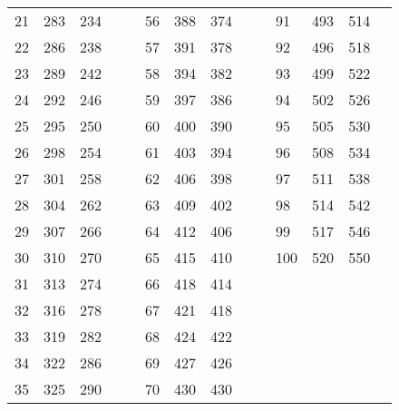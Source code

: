 \begin{table}[!h]
\begin{tabular}{|l|l|l|ll|l|l|l|llllll}
		21 & 283 & 234 &  &  & 56 & 388 & 374 &  & \multicolumn{1}{l|}{} & \multicolumn{1}{l|}{91} & \multicolumn{1}{l|}{493} & \multicolumn{1}{l|}{514} &  \\ \cline{1-3} \cline{6-8} \cline{11-13}
		22 & 286 & 238 &  &  & 57 & 391 & 378 &  & \multicolumn{1}{l|}{} & \multicolumn{1}{l|}{92} & \multicolumn{1}{l|}{496} & \multicolumn{1}{l|}{518} &  \\ \cline{1-3} \cline{6-8} \cline{11-13}
		23 & 289 & 242 &  &  & 58 & 394 & 382 &  & \multicolumn{1}{l|}{} & \multicolumn{1}{l|}{93} & \multicolumn{1}{l|}{499} & \multicolumn{1}{l|}{522} &  \\ \cline{1-3} \cline{6-8} \cline{11-13}
		24 & 292 & 246 &  &  & 59 & 397 & 386 &  & \multicolumn{1}{l|}{} & \multicolumn{1}{l|}{94} & \multicolumn{1}{l|}{502} & \multicolumn{1}{l|}{526} &  \\ \cline{1-3} \cline{6-8} \cline{11-13}
		25 & 295 & 250 &  &  & 60 & 400 & 390 &  & \multicolumn{1}{l|}{} & \multicolumn{1}{l|}{95} & \multicolumn{1}{l|}{505} & \multicolumn{1}{l|}{530} &  \\ \cline{1-3} \cline{6-8} \cline{11-13}
		26 & 298 & 254 &  &  & 61 & 403 & 394 &  & \multicolumn{1}{l|}{} & \multicolumn{1}{l|}{96} & \multicolumn{1}{l|}{508} & \multicolumn{1}{l|}{534} &  \\ \cline{1-3} \cline{6-8} \cline{11-13}
		27 & 301 & 258 &  &  & 62 & 406 & 398 &  & \multicolumn{1}{l|}{} & \multicolumn{1}{l|}{97} & \multicolumn{1}{l|}{511} & \multicolumn{1}{l|}{538} &  \\ \cline{1-3} \cline{6-8} \cline{11-13}
		28 & 304 & 262 &  &  & 63 & 409 & 402 &  & \multicolumn{1}{l|}{} & \multicolumn{1}{l|}{98} & \multicolumn{1}{l|}{514} & \multicolumn{1}{l|}{542} &  \\ \cline{1-3} \cline{6-8} \cline{11-13}
		29 & 307 & 266 &  &  & 64 & 412 & 406 &  & \multicolumn{1}{l|}{} & \multicolumn{1}{l|}{99} & \multicolumn{1}{l|}{517} & \multicolumn{1}{l|}{546} &  \\ \cline{1-3} \cline{6-8} \cline{11-13}
		30 & 310 & 270 &  &  & 65 & 415 & 410 &  & \multicolumn{1}{l|}{} & \multicolumn{1}{l|}{100} & \multicolumn{1}{l|}{520} & \multicolumn{1}{l|}{550} &  \\ \cline{1-3} \cline{6-8} \cline{11-13}
		31 & 313 & 274 &  &  & 66 & 418 & 414 &  &  &  &  &  &  \\ \cline{1-3} \cline{6-8}
		32 & 316 & 278 &  &  & 67 & 421 & 418 &  &  &  &  &  &  \\ \cline{1-3} \cline{6-8}
		33 & 319 & 282 &  &  & 68 & 424 & 422 &  &  &  &  &  &  \\ \cline{1-3} \cline{6-8}
		34 & 322 & 286 &  &  & 69 & 427 & 426 &  &  &  &  &  &  \\ \cline{1-3} \cline{6-8}
		35 & 325 & 290 &  &  & 70 & 430 & 430 &  &  &  &  &  &  \\ \cline{1-3} \cline{6-8}
	\end{tabular}
\end{table}
\clearpage

